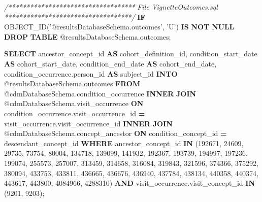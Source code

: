 \documentclass[
]{article}
\newenvironment{Shaded}{\begin{snugshade}}{\end{snugshade}}
\newcommand{\CommentTok}[1]{\textcolor[rgb]{0.56,0.35,0.01}{\textit{#1}}}
\newcommand{\ControlFlowTok}[1]{\textcolor[rgb]{0.13,0.29,0.53}{\textbf{#1}}}
\newcommand{\DecValTok}[1]{\textcolor[rgb]{0.00,0.00,0.81}{#1}}
\newcommand{\KeywordTok}[1]{\textcolor[rgb]{0.13,0.29,0.53}{\textbf{#1}}}
\newcommand{\NormalTok}[1]{#1}
\newcommand{\OperatorTok}[1]{\textcolor[rgb]{0.81,0.36,0.00}{\textbf{#1}}}
\newcommand{\StringTok}[1]{\textcolor[rgb]{0.31,0.60,0.02}{#1}}
\begin{document}
\begin{Shaded}
\begin{Highlighting}[]
\CommentTok{/***********************************}
\CommentTok{File VignetteOutcomes.sql}
\CommentTok{***********************************/}
\ControlFlowTok{IF}\NormalTok{ OBJECT_ID(}\StringTok{'@resultsDatabaseSchema.outcomes'}\NormalTok{, }\StringTok{'U'}\NormalTok{) }\KeywordTok{IS} \KeywordTok{NOT} \KeywordTok{NULL}
  \KeywordTok{DROP} \KeywordTok{TABLE}\NormalTok{ @resultsDatabaseSchema.outcomes;}

\KeywordTok{SELECT}\NormalTok{ ancestor_concept_id }\KeywordTok{AS}\NormalTok{ cohort_definition_id,}
\NormalTok{    condition_start_date }\KeywordTok{AS}\NormalTok{ cohort_start_date,}
\NormalTok{    condition_end_date }\KeywordTok{AS}\NormalTok{ cohort_end_date,}
\NormalTok{    condition_occurrence.person_id }\KeywordTok{AS}\NormalTok{ subject_id}
\KeywordTok{INTO}\NormalTok{ @resultsDatabaseSchema.outcomes}
\KeywordTok{FROM}\NormalTok{ @cdmDatabaseSchema.condition_occurrence}
\KeywordTok{INNER} \KeywordTok{JOIN}\NormalTok{ @cdmDatabaseSchema.visit_occurrence}
    \KeywordTok{ON}\NormalTok{ condition_occurrence.visit_occurrence_id }\OperatorTok{=}\NormalTok{ visit_occurrence.visit_occurrence_id}
\KeywordTok{INNER} \KeywordTok{JOIN}\NormalTok{ @cdmDatabaseSchema.concept_ancestor}
    \KeywordTok{ON}\NormalTok{ condition_concept_id }\OperatorTok{=}\NormalTok{ descendant_concept_id}
\KeywordTok{WHERE}\NormalTok{ ancestor_concept_id }\KeywordTok{IN}\NormalTok{ (}\DecValTok{192671}\NormalTok{, }\DecValTok{24609}\NormalTok{, }\DecValTok{29735}\NormalTok{, }\DecValTok{73754}\NormalTok{, }\DecValTok{80004}\NormalTok{, }\DecValTok{134718}\NormalTok{, }\DecValTok{139099}\NormalTok{,}
\DecValTok{141932}\NormalTok{, }\DecValTok{192367}\NormalTok{, }\DecValTok{193739}\NormalTok{, }\DecValTok{194997}\NormalTok{, }\DecValTok{197236}\NormalTok{, }\DecValTok{199074}\NormalTok{, }\DecValTok{255573}\NormalTok{, }\DecValTok{257007}\NormalTok{, }\DecValTok{313459}\NormalTok{, }\DecValTok{314658}\NormalTok{,}
\DecValTok{316084}\NormalTok{, }\DecValTok{319843}\NormalTok{, }\DecValTok{321596}\NormalTok{, }\DecValTok{374366}\NormalTok{, }\DecValTok{375292}\NormalTok{, }\DecValTok{380094}\NormalTok{, }\DecValTok{433753}\NormalTok{, }\DecValTok{433811}\NormalTok{, }\DecValTok{436665}\NormalTok{, }\DecValTok{436676}\NormalTok{,}
\DecValTok{436940}\NormalTok{, }\DecValTok{437784}\NormalTok{, }\DecValTok{438134}\NormalTok{, }\DecValTok{440358}\NormalTok{, }\DecValTok{440374}\NormalTok{, }\DecValTok{443617}\NormalTok{, }\DecValTok{443800}\NormalTok{, }\DecValTok{4084966}\NormalTok{, }\DecValTok{4288310}\NormalTok{)}
    \KeywordTok{AND}\NormalTok{ visit_occurrence.visit_concept_id }\KeywordTok{IN}\NormalTok{ (}\DecValTok{9201}\NormalTok{, }\DecValTok{9203}\NormalTok{);}
\end{Highlighting}
\end{Shaded}
\end{document}
